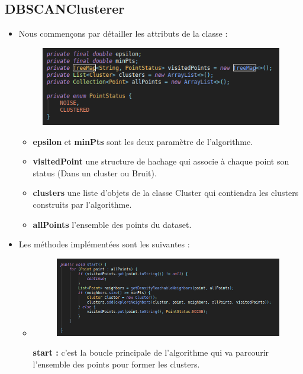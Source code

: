 	\subsection*{DBSCANClusterer}
		\begin{itemize}
			\item Nous commençons par détailler les attributs de la classe : 
			\begin{figure}[H]
				\centering
				\includegraphics[width=0.75\linewidth]{dbscan/images/dbscan/props.png}
			\end{figure}
			\begin{itemize}
				\item \textbf{epsilon} et \textbf{minPts} sont les deux paramètre de l'algorithme.
				\item \textbf{visitedPoint} une structure de hachage qui associe à chaque point son status (Dans un cluster ou Bruit).
				\item \textbf{clusters} une liste d'objets de la classe Cluster qui contiendra les clusters construits par l'algorithme.
				\item \textbf{allPoints} l'ensemble des points du dataset.
			\end{itemize}
			\item Les méthodes implémentées sont les suivantes : 
			\begin{itemize}
				\item \begin{figure}[H]
					\centering
					\includegraphics[width=0.75\linewidth]{dbscan/images/dbscan/start.png}
				\end{figure} \textbf{start : } c'est la boucle principale de l'algorithme qui va parcourir l'ensemble des points pour former les clusters.
			

\end{itemize}
\end{itemize}
